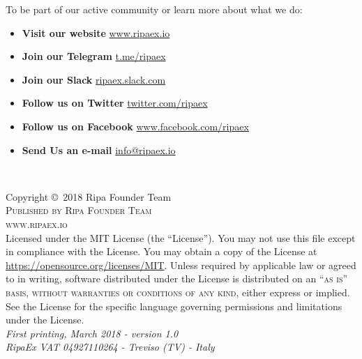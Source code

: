 \documentclass[11pt,fleqn,oneside]{book} %
\begin{document}
To be part of our active community or learn more about what we do:
\begin{itemize}
	\item \textbf{Visit our website} \href{https://www.ripaex.io}{\faHome \hspace{0.2cm} www.ripaex.io} 
	\item \textbf{Join our Telegram} \href{https://t.me/ripaex}{\faSend \hspace{0.2cm} t.me/ripaex}
	\item \textbf{Join our Slack} \href{https://join.slack.com/t/ripaex/shared_invite/enQtMzM4NzUwNjU4OTQ0LTY3MDJmMTdhYTNlZjJlNGUxNzM1YjUwYjgyYjZlMDJmOTg3NTIzNThmNTYyMGQ3ODBkOTRmYzk3Y2Y4MzBkOTY}{\faSlack \hspace{0.2cm} ripaex.slack.com}
	\item \textbf{Follow us on Twitter} \href{https://twitter.com/ripaex}{\faTwitter \hspace{0.2cm} twitter.com/ripaex}
	\item \textbf{Follow us on Facebook} \href{https://www.facebook.com/ripaex}{\faFacebook \hspace{0.2cm} www.facebook.com/ripaex}
	\item \textbf{Send Us an e-mail} \href{mailto:info@ripaex.io}{\faInternetExplorer \hspace{0.2cm} info@ripaex.io}
\end{itemize}



\newpage
~\vfill
\thispagestyle{empty}

\noindent Copyright \copyright\ 2018 Ripa Founder Team\\ %

\noindent \textsc{Published by Ripa Founder Team}\\ %

\noindent \textsc{www.ripaex.io}\\ %

\noindent Licensed under the MIT License (the ``License''). You may not use this file except in compliance with the License. 
You may obtain a copy of the License at \url{https://opensource.org/licenses/MIT}. Unless required by applicable law or agreed to in writing, 
software distributed under the License is distributed on an \textsc{``as is'' basis, without warranties or conditions of any kind}, 
either express or implied. See the License for the specific language governing permissions and limitations under the License.\\ %

\noindent \textit{First printing, March 2018 - version 1.0}\\ %

\noindent \textit{RipaEx VAT 04927110264 - Treviso (TV) - Italy} %
\end{document}
